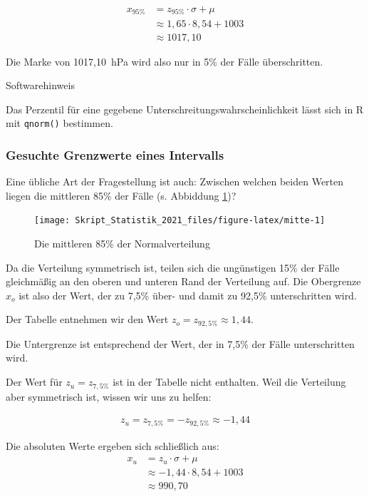\documentclass[
  11pt,
  ngerman,
  a4paper,
]{report}
\begin{document}
\[
  \begin{aligned}
    x_{95\%}&=z_{95\%}\cdot \sigma + \mu \\
       &\approx 1{,}65\cdot 8{,}54 + 1003\\
       &\approx 1017{,}10
  \end{aligned}
\]

Die Marke von 1017,10~hPa wird also nur in 5\% der Fälle überschritten.

Softwarehinweis

Das Perzentil für eine gegebene Unterschreitungswahrscheinlichkeit lässt sich in R mit \texttt{qnorm()} bestimmen.

\hypertarget{gesuchte-grenzwerte-eines-intervalls}{%
\subsubsection{Gesuchte Grenzwerte eines Intervalls}\label{gesuchte-grenzwerte-eines-intervalls}}

Eine übliche Art der Fragestellung ist auch: Zwischen welchen beiden Werten liegen die mittleren 85\% der Fälle (s. Abbiddung \ref{fig:mitte})?

\begin{figure}[!h]

{\centering \texttt{[image: Skript\_Statistik\_2021\_files/figure-latex/mitte-1]} 

}

\caption{Die mittleren 85\% der Normalverteilung}\label{fig:mitte}
\end{figure}

Da die Verteilung symmetrisch ist, teilen sich die ungünstigen 15\% der Fälle gleichmäßig an den oberen und unteren Rand der Verteilung auf. Die Obergrenze \(x_o\) ist also der Wert, der zu 7,5\% über- und damit zu 92,5\% unterschritten wird.

Der Tabelle entnehmen wir den Wert \(z_o=z_{92,5\%}\approx1{,}44\).

Die Untergrenze ist entsprechend der Wert, der in 7,5\% der Fälle unterschritten wird.

Der Wert für \(z_u=z_{7{,}5\%}\) ist in der Tabelle nicht enthalten. Weil die Verteilung aber symmetrisch ist, wissen wir uns zu helfen:

\[
  \begin{aligned}
    z_u=z_{7{,}5\%}=-z_{92{,}5\%}\approx-1{,}44
  \end{aligned}
\]

Die absoluten Werte ergeben sich schließlich aus:
\[
  \begin{aligned}
    x_u&=z_u\cdot \sigma + \mu \\
    &\approx-1{,}44 \cdot 8{,}54 + 1003\\
    &\approx990{,}70
  \end{aligned}
\]
\end{document}
